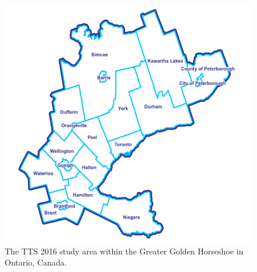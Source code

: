 \documentclass[]{elsarticle} %
\begin{document}
\begin{figure}

{\centering \includegraphics[width=0.8\linewidth]{images/Greater-Golden-Horseshoe-Map} 

}

\caption{\label{fig:TTS-16-survey-area}The TTS 2016 study area within the Greater Golden Horseshoe in Ontario, Canada.}\label{fig:TTS-16-survey-area}
\end{figure}

\begin{table}

\caption{\label{tab:creating-desc-stats-table}\label{tab:TTS-16-desc-stats}Descriptive statistics of the trips, workers, and jobs for the traffic analysis zones (TAZ) from the TTS 2016 dataset along with estimated car origin-destination travel times.}
\centering
{}
\end{table}
\end{document}
